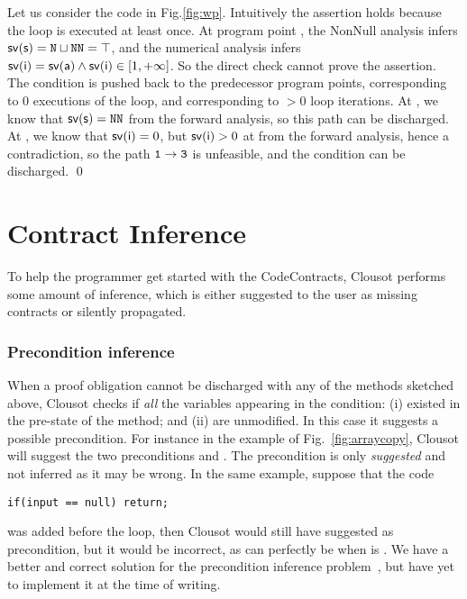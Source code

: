 \documentclass{llncs}
\begin{document}
\begin{example}
Let us consider the code in Fig.\ref{fig:wp}.  Intuitively the
assertion holds because the loop is executed at least once.  At
program point , the NonNull analysis infers $\mathsf{sv(s)} =
\mathtt{N} \sqcup \mathtt{NN} = \top$, and the numerical analysis infers
$\mathsf{sv(i)} = \mathsf{sv(a)} \wedge \mathsf{sv(i)} \in[1, +\infty]$.  So the direct check
cannot prove the assertion.  The condition is pushed back to the
predecessor program points,  corresponding to $0$ executions
of the loop, and  corresponding to $>0$ loop iterations.  At
, we know that $\mathsf{sv(s)} = \mathtt{NN}$ from the forward analysis,
so this path can be discharged.  At , we know that $\mathsf{sv(i)} =
0$, but $\mathsf{sv(i)} > 0$ at  from the forward analysis, hence a
contradiction, so the path $\mathtt{1} \rightarrow \mathtt{3}$ is
unfeasible, and the condition can be discharged. \qed
\end{example}

\section{Contract Inference}
To help the programmer get started with the CodeContracts,
Clousot performs some amount of inference, which is either suggested to
the user as missing contracts or silently propagated.

\subsubsection{Precondition inference} 
When a proof obligation cannot be discharged with any of the methods sketched above, Clousot checks if \emph{all} the variables appearing in the condition: (i) existed in the pre-state of the method; and (ii) are unmodified.
In this case it suggests a possible precondition.
For instance in the example of Fig.~\ref{fig:arraycopy}, Clousot will suggest the two preconditions  and .
The precondition is only \emph{suggested} and not inferred as it may be wrong. 
In the same example, suppose that  the code 
\begin{lstlisting}
if(input == null) return;
\end{lstlisting}
was added before the loop, then Clousot would still have suggested
 as precondition, but it would be incorrect, as
 can perfectly be  when  is
.  We have a better and correct solution for the
precondition inference problem~\cite{CousotCousotLogozzo-Pre}, but
have yet to implement it at the time of writing.
\end{document}
